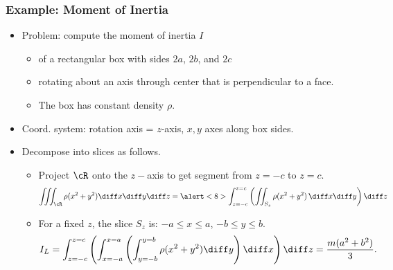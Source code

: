 \begin{frame}
\frametitle{Example: Moment of Inertia}
\begin{itemize}
\item Problem: compute the moment of inertia $I$
\begin{itemize}
\item \alert<2>{of a rectangular box with sides $2a$, $2b$, and $2c$}
\item \alert<3>{rotating about an axis through center that is perpendicular to a face.}
\item \alert<4>{The box has constant density $\rho$.}
\end{itemize}
\item<5-> Coord. system: rotation axis = $z$-axis, $x,y$ axes along box sides.
\item<7-> Decompose into slices as follows.
\begin{itemize}
\item<7> Project $\cR$ onto the $z-$axis \alert<8>{to get segment from $z=-c$ to $z=c$.}
\[
\iiint_{\cR} \rho (x^2+y^2) \diff x \diff y \diff z = \alert<8>{\int_{z=-c}^{z=c}} \left( \iint_{S_z} \rho (x^2+y^2)\, \diff x \diff y \right) \diff z
\]    
\item<9-> For a fixed $z$, the slice $S_z$ is: $-a \leq x \leq a$, $-b \leq  y \leq  b$.
\[
I_L = \int_{z=-c}^{z=c} \left(\int_{x=-a}^{x=a} \left( \int_{y=-b}^{y=b} \rho (x^2+y^2)  \diff y \right)  \diff x\right)  \diff z = \frac{m(a^2+b^2)}{3} .
\]
%

\end{itemize}
  \end{itemize}
\end{frame}